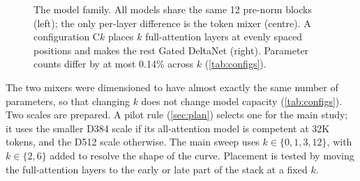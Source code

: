 \documentclass[10pt,a4paper]{article}
\begin{document}
\begin{figure}[t]
\caption{The model family. All models share the same 12 pre-norm blocks (left); the only per-layer
difference is the token mixer (centre). A configuration C$k$ places $k$ full-attention layers at
evenly spaced positions and makes the rest Gated DeltaNet (right). Parameter counts differ by at
most 0.14\% across $k$ (\cref{tab:configs}).}
\label{fig:arch}
\end{figure}

The two mixers were dimensioned to have almost exactly the same number of parameters, so that
changing $k$ does not change model capacity (\cref{tab:configs}). Two scales are prepared. A pilot
rule (\cref{sec:plan}) selects one for the main study; it uses the smaller D384 scale if its
all-attention model is competent at 32K tokens, and the D512 scale otherwise. The main sweep uses
$k\in\{0,1,3,12\}$, with $k\in\{2,6\}$ added to resolve the shape of the curve. Placement is tested
by moving the full-attention layers to the early or late part of the stack at a fixed $k$.
\end{document}
